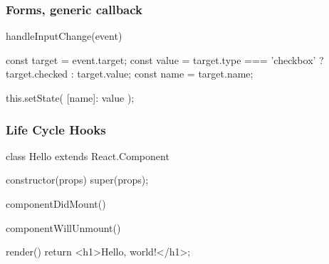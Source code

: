 \begin{frame}[fragile] \frametitle{Forms, generic callback}
\begin{CodeBox}{}
handleInputChange(event) {
  const target = event.target;
  const value =
    target.type === 'checkbox' ?
                    target.checked : target.value;
  const name = target.name;

  this.setState({
    [name]: value
  });
}
\end{CodeBox}
\end{frame}

%

\begin{frame}[fragile] \frametitle{Life Cycle Hooks}
\begin{CodeBox}{}
class Hello extends React.Component {
  constructor(props) {
    super(props);
  }

  componentDidMount() {  }

  componentWillUnmount() {  }

  render() {
    return <h1>Hello, world!</h1>;
  }
}
\end{CodeBox}
\end{frame}
